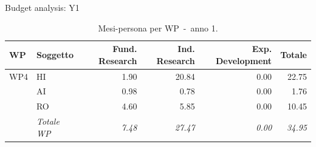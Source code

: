 \documentclass[aspectratio=169,10pt]{beamer}
\begin{document}
\begin{frame}{Budget analysis: Y1}
  
\begin{table}[H]\centering\scriptsize\caption{Mesi-persona per WP~-~anno 1.}\label{tab:wp-w-y1}
\begin{tabular}{llrrrr}\toprule\textbf{WP} & \textbf{Soggetto} & \textbf{Fund. Research} & \textbf{Ind. Research} & \textbf{Exp. Development} & \textbf{Totale} \\\midrule
WP4 & HI & 1.90 & 20.84 & 0.00 & 22.75 \\
 & AI & 0.98 & 0.78 & 0.00 & 1.76 \\
 & RO & 4.60 & 5.85 & 0.00 & 10.45 \\
 & \textit{Totale WP} & \textit{7.48} & \textit{27.47} & \textit{0.00} & \textit{34.95} \\
\bottomrule\end{tabular}
\end{table}
\end{frame}
\end{document}
